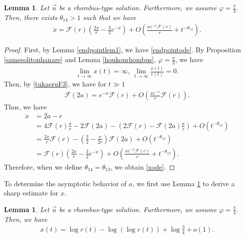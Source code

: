 \documentclass[10pt,a4paper]{amsart}
\newtheorem{lemma}[theorem]{Lemma}
\numberwithin{equation}{section}
\begin{document}
\begin{lemma}\label{xodelem}
Let $\vec{u}$ be a rhombus-type solution. Furthermore, we assume $\varphi=\frac{\pi}{3}$. Then, there exists $\theta_{14}>1$ such that we have
\begin{align}\label{xode}
\dot{x}=\mathcal{F}(r)\left(\frac{2x}{r}-\frac{3}{2}e^{-x}\right)+O\left(\frac{xe^{-x}\mathcal{F}(r)}{r}+t^{-\theta_{14}}\right).
\end{align}
\end{lemma}
\begin{proof}
First, by Lemma \ref{endpointlem1}, we have \eqref{endpointode}. By Proposition \ref{samesolitonhanare} and Lemma \ref{houkourhombus}, $\varphi=\frac{\pi}{3}$, we have
\begin{align}\label{xpcondi}
\lim_{t\to\infty}x(t)=\infty,\ \lim_{t\to\infty}\frac{x(t)}{r(t)}=0.
\end{align}
Then, by \eqref{tukaeruF3}, we have for $t\gg 1$
\begin{align*}
\mathcal{F}(2a)=e^{-x}\mathcal{F}(r)+O\left(\frac{xe^{-x}}{r}\mathcal{F}(r)\right).
\end{align*}
Thus, we have
\begin{align*}
\dot{x}&=2\dot{a}-\dot{r}
\\
&=4\mathcal{F}(r)\frac{a}{r}-2\mathcal{F}(2a)-\left(2\mathcal{F}(r)-\mathcal{F}(2a)\frac{a}{r}\right)+O\left(t^{-\theta_{13}}\right)
\\
&=\frac{2x}{r}\mathcal{F}(r)-\left(\frac{3}{2}-\frac{x}{2r}\right)\mathcal{F}(2a)+O\left(t^{-\theta_{13}}\right)
\\
&=\mathcal{F}(r)\left(\frac{2x}{r}-\frac{3}{2}e^{-x}\right)+O\left(\frac{xe^{-x}\mathcal{F}(r)}{r}+t^{-\theta_{13}}\right).
\end{align*}
Therefore, when we define $\theta_{14}=\theta_{13}$, we obtain \eqref{xode}.




\end{proof}

To determine the asymptotic behavior of $a$, we first use Lemma \ref{xodelem} to derive a sharp estimate for $x$.

\begin{lemma}\label{xsharpeslem}
Let $\vec{u}$ be a rhombus-type solution. Furthermore, we assume $\varphi=\frac{\pi}{3}$. Then, we have
\begin{align}\label{xnagasa}
x(t)=\log{r(t)}-\log{(\log{r(t)})}+\log{\frac{3}{4}}+o(1).
\end{align}
\end{lemma}
\end{document}
